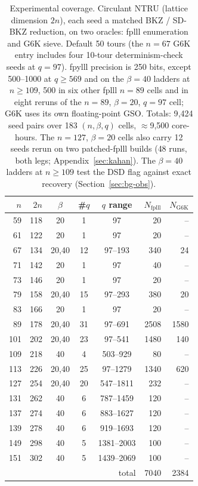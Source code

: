 \documentclass[journal=cic,version=preprint]{iacrj}
\begin{document}
\begin{table}[t]
\caption{Experimental coverage. Circulant NTRU (lattice dimension $2n$), each seed a
matched BKZ / SD-BKZ reduction, on two oracles: fplll enumeration and G6K sieve.
Default 50 tours (the $n=67$ G6K entry includes four 10-tour determinism-check
seeds at $q=97$). fpylll precision is 250 bits, except 500--1000 at $q\ge569$ and on the $\beta=40$ ladders at $n\ge109$, 500 in six other fplll $n=89$ cells and in eight reruns of the $n=89$, $\beta=20$, $q=97$ cell; G6K uses its own floating-point GSO. Totals: 9{,}424 seed pairs over 183 $(n,\beta,q)$ cells,
$\approx$9{,}500 core-hours. The $n=127$, $\beta=20$ cells also carry 12 seeds
rerun on two patched-fplll builds (48 runs, both legs; Appendix~\ref{sec:kahan}).
The $\beta=40$ ladders at $n\ge109$ test the DSD flag against exact recovery
(Section~\ref{sec:bg-obs}).}
\label{tab:coverage}
\centering
\begin{tabular}{rrcccrr}
\toprule
$n$ & $2n$ & $\beta$ & \#$q$ & $q$ range & $N_{\mathrm{fplll}}$ & $N_{\mathrm{G6K}}$ \\
\midrule
59  & 118 & 20    & 1  & 97        & 20   & --   \\
61  & 122 & 20    & 1  & 97        & 20   & --   \\
67  & 134 & 20,40 & 12 & 97--193   & 340  & 24   \\
71  & 142 & 20    & 1  & 97        & 40   & --   \\
73  & 146 & 20    & 1  & 97        & 20   & --   \\
79  & 158 & 20,40 & 15 & 97--293   & 380  & 20   \\
83  & 166 & 20    & 1  & 97        & 20   & --   \\
89  & 178 & 20,40 & 31 & 97--691   & 2508 & 1580 \\
101 & 202 & 20,40 & 23 & 97--541   & 1480 & 140  \\
109 & 218 & 40    & 4  & 503--929  & 80   & --   \\
113 & 226 & 20,40 & 25 & 97--1279  & 1340 & 620  \\
127 & 254 & 20,40 & 20 & 547--1811 & 232  & --   \\
131 & 262 & 40    & 6  & 787--1459 & 120  & --   \\
137 & 274 & 40    & 6  & 883--1627 & 120  & --   \\
139 & 278 & 40    & 6  & 919--1693 & 120  & --   \\
149 & 298 & 40    & 5  & 1381--2003 & 100 & --   \\
151 & 302 & 40    & 5  & 1439--2069 & 100 & --   \\
\midrule
\multicolumn{5}{r}{total} & 7040 & 2384 \\
\bottomrule
\end{tabular}
\end{table}
\end{document}
